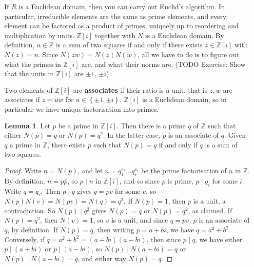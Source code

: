 \documentclass{article}
\newcommand{\Z}{\mathbb{Z}}
\newcommand{\rb}[1]{\left( #1 \right)}
\renewcommand{\sb}[1]{\left[ #1 \right]}
\newcommand{\cb}[1]{\left\{ #1 \right\}}
\theoremstyle{definition}\newtheorem{definition}{Definition}
\theoremstyle{definition}\newtheorem*{remark}{Remark}
\theoremstyle{definition}\newtheorem*{example}{Example}
\theoremstyle{definition}\newtheorem*{note}{Note}
\newtheorem{lemma}[definition]{Lemma}
\begin{document}
If $ R $ is a Euclidean domain, then you can carry out Euclid's algorithm. In particular, irreducible elements are the same as prime elements, and every element can be factored as a product of primes, uniquely up to reordering and multiplication by units. $ \Z\sb{i} $ together with $ N $ is a Euclidean domain. By definition, $ n \in \Z $ is a sum of two squares if and only if there exists $ z \in \Z\sb{i} $ with $ N\rb{z} = n $. Since $ N\rb{zw} = N\rb{z}N\rb{w} $, all we have to do is to figure out what the primes in $ \Z\sb{i} $ are, and what their norms are. (TODO Exercise: Show that the units in $ \Z\sb{i} $ are $ \pm 1 $, $ \pm i $)


Two elements of $ \Z\sb{i} $ are \textbf{associates} if their ratio is a unit, that is $ z, w $ are associates if $ z = uw $ for $ u \in \cb{\pm 1, \pm i} $. $ \Z\sb{i} $ is a Euclidean domain, so in particular we have unique factorisation into primes.

\begin{lemma}
Let $ p $ be a prime in $ \Z\sb{i} $. Then there is a prime $ q $ of $ \Z $ such that either $ N\rb{p} = q $ or $ N\rb{p} = q^2 $. In the latter case, $ p $ is an associate of $ q $. Given $ q $ a prime in $ \Z $, there exists $ p $ such that $ N\rb{p} = q $ if and only if $ q $ is a sum of two squares.
\end{lemma}

\begin{proof}
Write $ n = N\rb{p} $, and let $ n = q_1^{s_1} \dots q_r^{s_r} $ be the prime factorisation of $ n $ in $ \Z $. By definition, $ n = p\bar{p} $, so $ p \mid n $ in $ \Z\sb{i} $, and so since $ p $ is prime, $ p \mid q_i $ for some $ i $. Write $ q = q_i $. Then $ p \mid q $ gives $ q = pv $ for some $ v $, so $ N\rb{p}N\rb{v} = N\rb{pv} = N\rb{q} = q^2 $. If $ N\rb{p} = 1 $, then $ p $ is a unit, a contradiction. So $ N\rb{p} \mid q^2 $ gives $ N\rb{p} = q $ or $ N\rb{p} = q^2 $, as claimed. If $ N\rb{p} = q^2 $, then $ N\rb{v} = 1 $, so $ v $ is a unit, and since $ q = pv $, $ p $ is an associate of $ q $, by definition. If $ N\rb{p} = q $, then writing $ p = a + bi $, we have $ q = a^2 + b^2 $. Conversely, if $ q = a^2 + b^2 = \rb{a + bi}\rb{a - bi} $, then since $ p \mid q $, we have either $ p \mid \rb{a + bi} $ or $ p \mid \rb{a - bi} $, so $ N\rb{p} \mid N\rb{a + bi} = q $ or $ N\rb{p} \mid N\rb{a - bi} = q $, and either way $ N\rb{p} = q $.
\end{proof}
\end{document}
